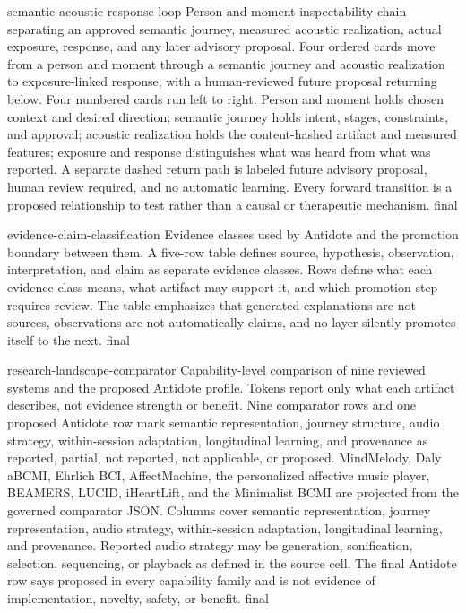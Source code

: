 
\AntidoteDeclareVisualText
  {semantic-acoustic-response-loop}
  {Person-and-moment inspectability chain separating an approved semantic journey, measured acoustic realization, actual exposure, response, and any later advisory proposal.}
  {Four ordered cards move from a person and moment through a semantic journey and acoustic realization to exposure-linked response, with a human-reviewed future proposal returning below.}
  {Four numbered cards run left to right. Person and moment holds chosen context and desired direction; semantic journey holds intent, stages, constraints, and approval; acoustic realization holds the content-hashed artifact and measured features; exposure and response distinguishes what was heard from what was reported. A separate dashed return path is labeled future advisory proposal, human review required, and no automatic learning. Every forward transition is a proposed relationship to test rather than a causal or therapeutic mechanism.}
  {final}

\AntidoteDeclareVisualText
  {evidence-claim-classification}
  {Evidence classes used by Antidote and the promotion boundary between them.}
  {A five-row table defines source, hypothesis, observation, interpretation, and claim as separate evidence classes.}
  {Rows define what each evidence class means, what artifact may support it, and which promotion step requires review. The table emphasizes that generated explanations are not sources, observations are not automatically claims, and no layer silently promotes itself to the next.}
  {final}

\AntidoteDeclareVisualText
  {research-landscape-comparator}
  {Capability-level comparison of nine reviewed systems and the proposed Antidote profile. Tokens report only what each artifact describes, not evidence strength or benefit.}
  {Nine comparator rows and one proposed Antidote row mark semantic representation, journey structure, audio strategy, within-session adaptation, longitudinal learning, and provenance as reported, partial, not reported, not applicable, or proposed.}
  {MindMelody, Daly aBCMI, Ehrlich BCI, AffectMachine, the personalized affective music player, BEAMERS, LUCID, iHeartLift, and the Minimalist BCMI are projected from the governed comparator JSON. Columns cover semantic representation, journey representation, audio strategy, within-session adaptation, longitudinal learning, and provenance. Reported audio strategy may be generation, sonification, selection, sequencing, or playback as defined in the source cell. The final Antidote row says proposed in every capability family and is not evidence of implementation, novelty, safety, or benefit.}
  {final}

